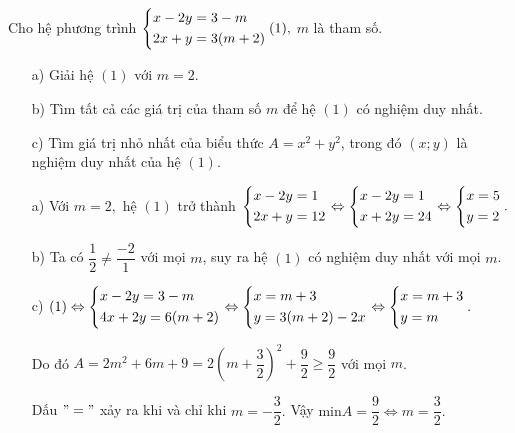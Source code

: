 \begin{ex}%
    Cho hệ phương trình $\left\{\begin{aligned}& x-2y=3-m\\ & 2x+y = 3(m+2)\end{aligned}\right. (1),$ $m$ là tham số.
    \begin{enumerate}
        \item[a)] Giải hệ $(1)$ với $m = 2$.
        \item[b)] Tìm tất cả các giá trị của tham số $m$ để hệ $(1)$ có nghiệm duy nhất.
        \item[c)] Tìm giá trị nhỏ nhất của biểu thức $A= x^2+y^2$, trong đó $(x;y)$ là nghiệm duy nhất của hệ $(1)$.
    \end{enumerate}
\loigiai
    {
    \begin{enumerate}
        \item[a)] Với $m = 2,$ hệ $(1)$ trở thành $\left\{\begin{aligned}& x-2y=1 \\ & 2x+y=12\end{aligned}\right. \Leftrightarrow
 \left\{\begin{aligned}& x-2y=1 \\ & x+2y=24\end{aligned}\right. 
\Leftrightarrow \left\{\begin{aligned}& x =5 \\ & y=2\end{aligned}\right..$ 
        \item[b)] Ta có $\dfrac{1}{2} \ne \dfrac{-2}{1}$ với mọi $m$, suy ra hệ $(1)$ có nghiệm duy nhất với mọi $m$.
       \item[c)] $(1) \Leftrightarrow \left\{\begin{aligned}& x-2y=3-m \\ & 4x+2y=6(m+2)\end{aligned}\right. \Leftrightarrow \left\{\begin{aligned}& x = m+3 \\ & y = 3(m+2)-2x\end{aligned}\right. \Leftrightarrow \left\{\begin{aligned}& x = m+3 \\ & y=m\end{aligned}\right..  $

Do đó $A = 2m^2+6m+9 = 2\left(m+\dfrac{3}{2}\right)^2+\dfrac{9}{2} \ge \dfrac{9}{2}$ với mọi $m$.

Dấu $"="$ xảy ra khi và chỉ khi $m = -\dfrac{3}{2}.$ Vậy $\mathrm{min}A=\dfrac{9}{2} \Leftrightarrow m = \dfrac{3}{2}.$
    \end{enumerate}
    }
\end{ex}

